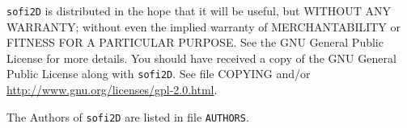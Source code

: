 \documentclass[11pt,english,a4paper]{article}
\begin{document}
\texttt{sofi2D} is distributed in the hope that it will be useful, but WITHOUT ANY WARRANTY; without even the implied warranty of MERCHANTABILITY or FITNESS FOR A PARTICULAR PURPOSE. See the GNU General Public License for more details. You should have received a copy of the GNU General Public License along with \texttt{sofi2D}. See file COPYING and/or \url{http://www.gnu.org/licenses/gpl-2.0.html}.

The Authors of \texttt{sofi2D} are listed in file \texttt{AUTHORS}.





\printbibliography   

\appendix


\end{document}
